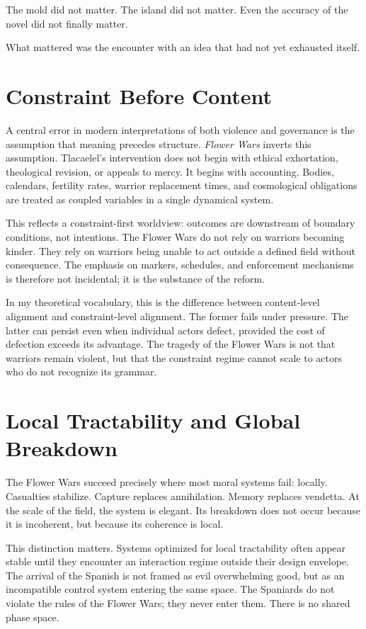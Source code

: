 \documentclass[12pt]{article}
\begin{document}
The mold did not matter. The island did not matter. Even the accuracy of the novel did not finally matter.

What mattered was the encounter with an idea that had not yet exhausted itself.

\section*{Constraint Before Content}

A central error in modern interpretations of both violence and governance is the assumption that meaning precedes structure. \textit{Flower Wars} inverts this assumption. Tlacaelel's intervention does not begin with ethical exhortation, theological revision, or appeals to mercy. It begins with accounting. Bodies, calendars, fertility rates, warrior replacement times, and cosmological obligations are treated as coupled variables in a single dynamical system.

This reflects a constraint-first worldview: outcomes are downstream of boundary conditions, not intentions. The Flower Wars do not rely on warriors becoming kinder. They rely on warriors being unable to act outside a defined field without consequence. The emphasis on markers, schedules, and enforcement mechanisms is therefore not incidental; it is the substance of the reform.

In my theoretical vocabulary, this is the difference between content-level alignment and constraint-level alignment. The former fails under pressure. The latter can persist even when individual actors defect, provided the cost of defection exceeds its advantage. The tragedy of the Flower Wars is not that warriors remain violent, but that the constraint regime cannot scale to actors who do not recognize its grammar.

\section*{Local Tractability and Global Breakdown}

The Flower Wars succeed precisely where most moral systems fail: locally. Casualties stabilize. Capture replaces annihilation. Memory replaces vendetta. At the scale of the field, the system is elegant. Its breakdown does not occur because it is incoherent, but because its coherence is local.

This distinction matters. Systems optimized for local tractability often appear stable until they encounter an interaction regime outside their design envelope. The arrival of the Spanish is not framed as evil overwhelming good, but as an incompatible control system entering the same space. The Spaniards do not violate the rules of the Flower Wars; they never enter them. There is no shared phase space.
\end{document}
